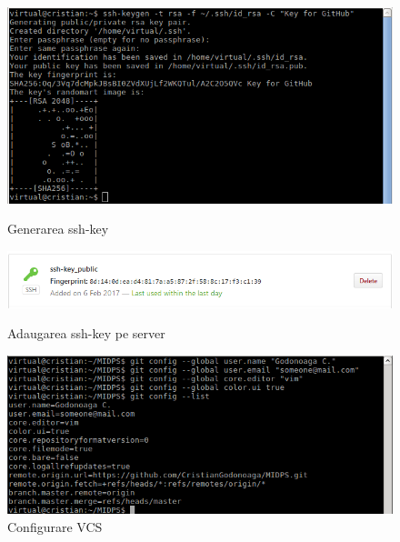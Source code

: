 \begin{figure}[htb]
	\begin{center}
		\centering
		\includegraphics[scale = 0.9]{img/ssh_key.png}
		\caption{Generarea ssh-key}%
		\label{fig:generarea_ssh_key}
	\end{center}


	\begin{center}
		\centering
		\includegraphics[scale = 0.8]{img/add_key_onserver.png}
		\caption{Adaugarea ssh-key pe server}%
		\label{fig:add_key_onserver}
	\end{center}

	\begin{center}
		\centering
		\includegraphics[scale = 0.9]{img/git_config.png}
		\caption{Configurare VCS}%
		\label{fig:git_config}
	\end{center}
\end{figure}
\clearpage